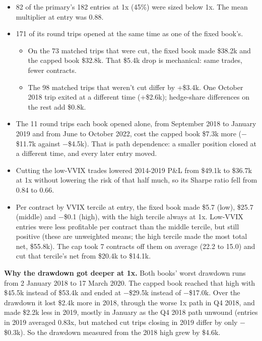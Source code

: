 \documentclass{article}
\begin{document}
\begin{itemize}

\item 82 of the primary's 182 entries at 1x (45\%) were sized below 1x. The mean multiplier at entry was 0.88.

\item 171 of its round trips opened at the same time as one of the fixed book's.

\begin{itemize}

\item On the 73 matched trips that were cut, the fixed book made \$38.2k and the capped book \$32.8k. That \$5.4k drop is mechanical: same trades, fewer contracts.

\item The 98 matched trips that weren't cut differ by +\$3.4k. One October 2018 trip exited at a different time (+\$2.6k); hedge-share differences on the rest add \$0.8k.

\end{itemize}

\item The 11 round trips each book opened alone, from September 2018 to January 2019 and from June to October 2022, cost the capped book \$7.3k more (\ensuremath{-}\$11.7k against \ensuremath{-}\$4.5k). That is path dependence: a smaller position closed at a different time, and every later entry moved.

\item Cutting the low-VVIX trades lowered 2014-2019 P\&L from \$49.1k to \$36.7k at 1x without lowering the risk of that half much, so its Sharpe ratio fell from 0.84 to 0.66.

\item Per contract by VVIX tercile at entry, the fixed book made \$5.7 (low), \$25.7 (middle) and \ensuremath{-}\$0.1 (high), with the high tercile always at 1x. Low-VVIX entries were less profitable per contract than the middle tercile, but still positive (these are unweighted means; the high tercile made the most total net, \$55.8k). The cap took 7 contracts off them on average (22.2 to 15.0) and cut that tercile's net from \$20.4k to \$14.1k.

\end{itemize}

\textbf{Why the drawdown got deeper at 1x.} Both books' worst drawdown runs from 2 January 2018 to 17 March 2020. The capped book reached that high with \$45.5k instead of \$53.4k and ended at \ensuremath{-}\$29.5k instead of \ensuremath{-}\$17.0k. Over the drawdown it lost \$2.4k more in 2018, through the worse 1x path in Q4 2018, and made \$2.2k less in 2019, mostly in January as the Q4 2018 path unwound (entries in 2019 averaged 0.83x, but matched cut trips closing in 2019 differ by only \ensuremath{-}\$0.3k). So the drawdown measured from the 2018 high grew by \$4.6k.
\end{document}

